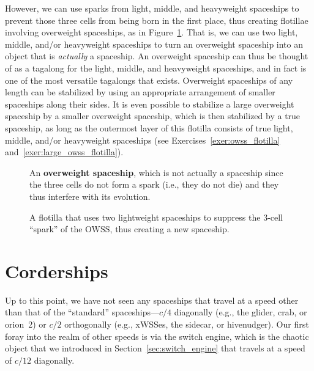 However, we can use sparks from light, middle, and heavyweight spaceships to prevent those three cells from being born in the first place, thus creating flotillae involving overweight spaceships, as in Figure~\ref{fig:owss_flotilla}. That is, we can use two light, middle, and/or heavyweight spaceships to turn an overweight spaceship into an object that is \emph{actually} a spaceship. An overweight spaceship can thus be thought of as a tagalong for the light, middle, and heavyweight spaceships, and in fact is one of the most versatile tagalongs that exists. Overweight spaceships of any length can be stabilized by using an appropriate arrangement of smaller spaceships along their sides. It is even possible to stabilize a large overweight spaceship by a smaller overweight spaceship, which is then stabilized by a true spaceship, as long as the outermost layer of this flotilla consists of true light, middle, and/or heavyweight spaceships (see Exercises~\ref{exer:owss_flotilla} and~\ref{exer:large_owss_flotilla}).

\begin{figure}[!htb]
	\centering
	\begin{minipage}[b]{.41\textwidth}
		\centering
		\caption{An \textbf{overweight spaceship}, which is not actually a spaceship since the three  cells do not form a spark (i.e., they do not die) and they thus interfere with its evolution.}\label{fig:overweight_spaceship}
	\end{minipage} \hfill %
	\begin{minipage}[b]{.55\textwidth}
		\centering
		\caption{A flotilla that uses two lightweight spaceships to suppress the $3$-cell ``spark'' of the OWSS, thus creating a new spaceship.}\label{fig:owss_flotilla}
	\end{minipage}
\end{figure}



\section{Corderships}\label{sec:corderships}

Up to this point, we have not seen any spaceships that travel at a speed other than that of the ``standard'' spaceships---$c/4$ diagonally (e.g., the glider, crab, or orion~2) or $c/2$ orthogonally (e.g., xWSSes, the sidecar, or hivenudger). Our first foray into the realm of other speeds is via the switch engine, which is the chaotic object that we introduced in Section~\ref{sec:switch_engine} that travels at a speed of $c/12$ diagonally.

